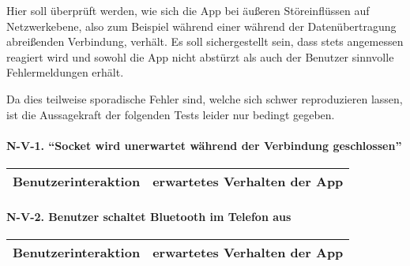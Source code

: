Hier soll überprüft werden, wie sich die App bei äußeren Störeinflüssen
auf Netzwerkebene, also zum Beispiel während einer während der
Datenübertragung abreißenden Verbindung, verhält. Es soll sichergestellt
sein, dass stets angemessen reagiert wird und sowohl die App nicht
abstürzt als auch der Benutzer sinnvolle Fehlermeldungen erhält.

Da dies teilweise sporadische Fehler sind, welche sich schwer
reproduzieren lassen, ist die Aussagekraft der folgenden Tests leider
nur bedingt gegeben.

\paragraph{\texorpdfstring{N-V-1. ``Socket wird unerwartet während der
Verbindung
geschlossen''}{N-V-1. Socket wird unerwartet während der Verbindung geschlossen}}\label{socket-wird-unerwartet-wuxe4hrend-der-verbindung-geschlossen}

\begin{longtable}{p{8cm}p{8.5cm}}
\toprule
Benutzerinteraktion & erwartetes Verhalten der App\tabularnewline
\midrule
\endhead
\bottomrule
\end{longtable}

\paragraph{N-V-2. Benutzer schaltet Bluetooth im Telefon
aus}\label{benutzer-schaltet-bluetooth-im-telefon-aus}

\begin{longtable}{p{8cm}p{8.5cm}}
\toprule
Benutzerinteraktion & erwartetes Verhalten der App\tabularnewline
\midrule
\endhead
\bottomrule
\end{longtable}

